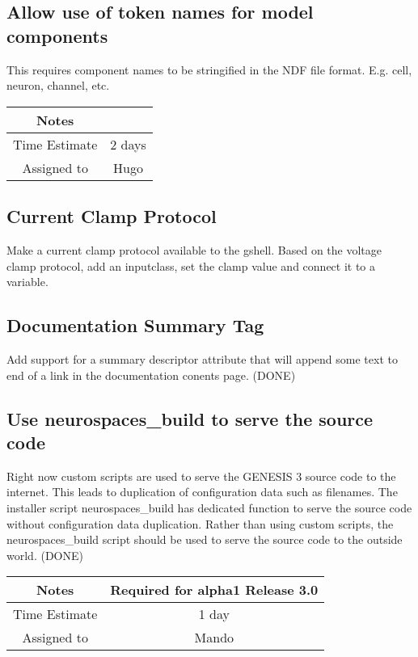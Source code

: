 \documentclass[12pt]{article}
\begin{document}
\subsection{Allow use of token names for model components}

This requires component names to be stringified in the NDF file
format. E.g. cell, neuron, channel, etc.

{
  \vspace{5mm}
  \centering
  \begin{tabular}{|c|c|}
    \hline
    Notes
    & \\
    \hline
    Time Estimate
    & 2 days \\
    \hline
    Assigned to
    & Hugo \\
    \hline
  \end{tabular}
}

\subsection{Current Clamp Protocol}

Make a current clamp protocol available to the gshell.  Based on the
voltage clamp protocol, add an inputclass, set the clamp value and
connect it to a variable.


\subsection{Documentation Summary Tag}

Add support for a summary descriptor attribute that will append
some text to end of a link in the documentation conents page. (DONE)


\subsection{Use neurospaces\_build to serve the source code}

Right now custom scripts are used to serve the GENESIS 3 source code
to the internet.  This leads to duplication of configuration data such
as filenames.  The installer script neurospaces\_build has dedicated
function to serve the source code without configuration data
duplication.  Rather than using custom scripts, the neurospaces\_build
script should be used to serve the source code to the outside world. (DONE)

{
  \vspace{5mm}
  \centering
  \begin{tabular}{|c|c|}
    \hline
    Notes
    & Required for alpha1 Release 3.0 \\
    \hline
    Time Estimate
    & 1 day \\
    \hline
    Assigned to
    & Mando \\
    \hline
  \end{tabular}
}
\end{document}
